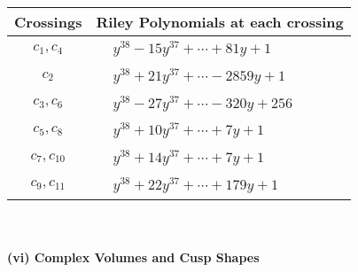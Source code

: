 \documentclass[1p]{elsarticle_modified}
\theoremstyle{definition}
\begin{document}
\begin{tabular}{m{50pt}|m{274pt}}
Crossings & \hspace{64pt}Riley Polynomials at each crossing \\
\hline $$\begin{aligned}c_{1},c_{4}\end{aligned}$$&$\begin{aligned}
&y^{38}-15 y^{37}+\cdots+81 y+1
\end{aligned}$\\
\hline $$\begin{aligned}c_{2}\end{aligned}$$&$\begin{aligned}
&y^{38}+21 y^{37}+\cdots-2859 y+1
\end{aligned}$\\
\hline $$\begin{aligned}c_{3},c_{6}\end{aligned}$$&$\begin{aligned}
&y^{38}-27 y^{37}+\cdots-320 y+256
\end{aligned}$\\
\hline $$\begin{aligned}c_{5},c_{8}\end{aligned}$$&$\begin{aligned}
&y^{38}+10 y^{37}+\cdots+7 y+1
\end{aligned}$\\
\hline $$\begin{aligned}c_{7},c_{10}\end{aligned}$$&$\begin{aligned}
&y^{38}+14 y^{37}+\cdots+7 y+1
\end{aligned}$\\
\hline $$\begin{aligned}c_{9},c_{11}\end{aligned}$$&$\begin{aligned}
&y^{38}+22 y^{37}+\cdots+179 y+1
\end{aligned}$\\
\hline
\end{tabular}\\~\\
\newpage\flushleft \textbf{(vi) Complex Volumes and Cusp Shapes}
\end{document}
